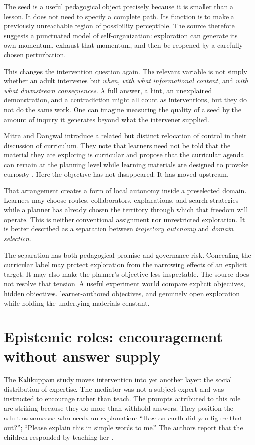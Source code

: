\documentclass[11pt]{article}
\begin{document}
The seed is a useful pedagogical object precisely because it is smaller than a lesson. It does not need to specify a complete path. Its function is to make a previously unreachable region of possibility perceptible. The source therefore suggests a punctuated model of self-organization: exploration can generate its own momentum, exhaust that momentum, and then be reopened by a carefully chosen perturbation.

This changes the intervention question again. The relevant variable is not simply whether an adult intervenes but \emph{when}, \emph{with what informational content}, and \emph{with what downstream consequences}. A full answer, a hint, an unexplained demonstration, and a contradiction might all count as interventions, but they do not do the same work. One can imagine measuring the quality of a seed by the amount of inquiry it generates beyond what the intervener supplied.

Mitra and Dangwal introduce a related but distinct relocation of control in their discussion of curriculum. They note that learners need not be told that the material they are exploring is curricular and propose that the curricular agenda can remain at the planning level while learning materials are designed to provoke curiosity \citep{mitra2010limits}. Here the objective has not disappeared. It has moved upstream.

That arrangement creates a form of local autonomy inside a preselected domain. Learners may choose routes, collaborators, explanations, and search strategies while a planner has already chosen the territory through which that freedom will operate. This is neither conventional assignment nor unrestricted exploration. It is better described as a separation between \emph{trajectory autonomy} and \emph{domain selection}.

The separation has both pedagogical promise and governance risk. Concealing the curricular label may protect exploration from the narrowing effects of an explicit target. It may also make the planner's objective less inspectable. The source does not resolve that tension. A useful experiment would compare explicit objectives, hidden objectives, learner-authored objectives, and genuinely open exploration while holding the underlying materials constant.

\section{Epistemic roles: encouragement without answer supply}
The Kalikuppam study moves intervention into yet another layer: the social distribution of expertise. The mediator was not a subject expert and was instructed to encourage rather than teach. The prompts attributed to this role are striking because they do more than withhold answers. They position the adult as someone who needs an explanation: ``How on earth did you figure that out?''; ``Please explain this in simple words to me.'' The authors report that the children responded by teaching her \citep{mitra2010limits}.
\end{document}
